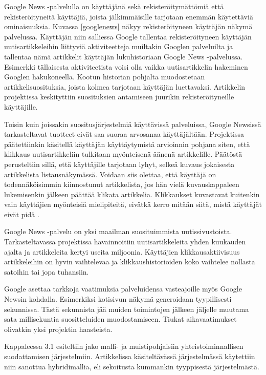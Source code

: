 \documentclass[12pt,finnish]{tktltiki2}
\theoremstyle{definition}
\theoremstyle{remark}
\begin{document}
Google News -palvelulla on käyttäjänä sekä rekisteröitymättömiä että rekisteröityneitä käyttäjiä, joista jälkimmäisille tarjotaan enemmän käytettäviä ominaisuuksia. Kuvassa \ref{googlenews} näkyy rekisteröityneen käyttäjän näkymä palvelussa. Käyttäjän niin salliessa Google tallentaa rekisteröityneen käyttäjän uutisartikkeleihin liittyviä aktiviteetteja muiltakin Googlen palveluilta ja tallentaa nämä artikkelit käyttäjän lukuhistoriaan Google News -palvelussa. Esimerkki tällaisesta aktiviteetista voisi olla vaikka uutisartikkelin hakeminen Googlen hakukoneella. Kootun historian pohjalta muodostetaan artikkelisuosituksia, joista kolmea tarjotaan käyttäjän luettavaksi. Artikkelin projektissa keskityttiin suosituksien antamiseen juurikin rekisteröityneille käyttäjille. 

Toisin kuin joissakin suositusjärjestelmiä käyttävissä palveluissa, Google Newsissä tarkasteltavat tuotteet eivät saa suoraa arvosanaa käyttäjältään. Projektissa päätettiinkin käsitellä käyttäjän käyttäytymistä arvioinnin pohjana siten, että klikkaus uutisartikkeliin tulkitaan myönteisenä äänenä artikkelille. Päätöstä perusteltiin sillä, että käyttäjille tarjotaan lyhyt, selkeä kuvaus jokaisesta artikkelista listausnäkymässä. Voidaan siis olettaa, että käyttäjä on todennäköisimmin kiinnostunut artikkelista, jos hän vielä kuvauskappaleen lukemisenkin jälkeen päättää klikata artikkelia. Klikkaukset kuvastavat kuitenkin vain käyttäjien myönteisiä mielipiteitä, eivätkä kerro mitään siitä, mistä käyttäjät eivät pidä \cite{Das:2007:GNP:1242572.1242610}.

Google News -palvelu on yksi maailman suosituimmista uutissivustoista. Tarkasteltavassa projektissa havainnoitiin uutisartikkeleita yhden kuukauden ajalta ja artikkeleita kertyi useita miljoonia. Käyttäjien klikkausaktiivisuus artikkeleihin on hyvin vaihtelevaa ja klikkaushistorioiden koko vaihtelee nollasta satoihin tai jopa tuhansiin.

Google asettaa tarkkoja vaatimuksia palveluidensa vasteajoille myös Google Newsin kohdalla. Esimerkiksi kotisivun näkymä generoidaan tyypillisesti sekunnissa. Tästä sekunnista jää muiden toimintojen jälkeen jäljelle muutama sata millisekuntia suositteluiden muodostamiseen. Tiukat aikavaatimukset olivatkin yksi projektin haasteista.

Kappaleessa 3.1 esiteltiin jako malli- ja muistipohjaisiin yhteistoiminnallisen suodattamisen järjestelmiin. Artikkelissa käsiteltävässä järjestelmässä käytettiin niin sanottua hybridimallia, eli sekoitusta kummankin tyyppisestä järjestelmästä.
\end{document}
